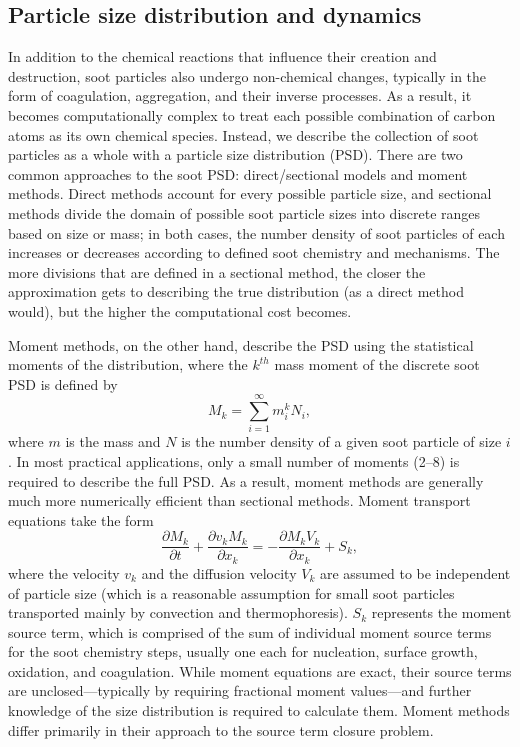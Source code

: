\documentclass[preprint,letterpaper]{elsarticle}
\begin{document}
\subsection{Particle size distribution and dynamics}
\label{ss:PSD_dynamics}

In addition to the chemical reactions that influence their creation and destruction, soot particles also undergo non-chemical changes, typically in the form of coagulation, aggregation, and their inverse processes. As a result, it becomes computationally complex to treat each possible combination of carbon atoms as its own chemical species. Instead, we describe the collection of soot particles as a whole with a particle size distribution (PSD). There are two common approaches to the soot PSD: direct/sectional models and moment methods. Direct methods account for every possible particle size, and sectional methods divide the domain of possible soot particle sizes into discrete ranges based on size or mass; in both cases, the number density of soot particles of each increases or decreases according to defined soot chemistry and mechanisms. The more divisions that are defined in a sectional method, the closer the approximation gets to describing the true distribution (as a direct method would), but the higher the computational cost becomes.

Moment methods, on the other hand, describe the PSD using the statistical moments of the distribution, where the $k^{th}$ mass moment of the discrete soot PSD is defined by
\begin{equation}
    M_k = \sum_{i=1}^{\infty} m_i^k N_i,
\end{equation}
where $m$ is the mass and $N$ is the number density of a given soot particle of size $i$. In most practical applications, only a small number of moments (2--8) is required to describe the full PSD. As a result, moment methods are generally much more numerically efficient than sectional methods. Moment transport equations take the form
\begin{equation}
    \label{e:momTransEq}
    \frac{\partial M_k}{\partial t} + \frac{\partial v_k M_k}{\partial x_k} = -\frac{\partial M_k V_k}{\partial x_k} + S_k,
\end{equation}
where the velocity $v_k$ and the diffusion velocity $V_k$ are assumed to be independent of particle size (which is a reasonable assumption for small soot particles transported mainly by convection and thermophoresis). $S_k$ represents the moment source term, which is comprised of the sum of individual moment source terms for the soot chemistry steps, usually one each for nucleation, surface growth, oxidation, and coagulation. While moment equations are exact, their source terms are unclosed---typically by requiring fractional moment values---and further knowledge of the size distribution is required to calculate them. Moment methods differ primarily in their approach to the source term closure problem.
\end{document}
